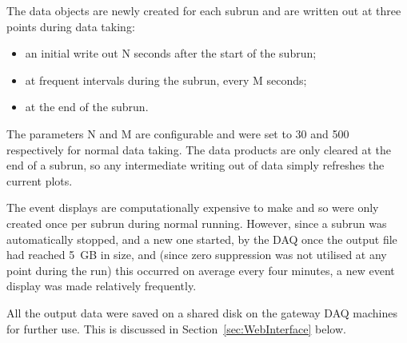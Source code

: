 The data objects are newly created for each subrun and are written out at three points during data taking:
\begin{itemize}
\item an initial write out N seconds after the start of the subrun;
\item at frequent intervals during the subrun, every M seconds;
\item at the end of the subrun.
\end{itemize}
The parameters N and M are configurable and were set to 30 and 500 respectively for normal data taking.  The data products are only cleared at the end of a subrun, so any intermediate writing out of data simply refreshes the current plots.

The event displays are computationally expensive to make and so were only created once per subrun during normal running.  However, since a subrun was automatically stopped, and a new one started, by the DAQ once the output file had reached 5~GB in size, and (since zero suppression was not utilised at any point during the run) this occurred on average every four minutes, a new event display was made relatively frequently.

All the output data were saved on a shared disk on the gateway DAQ machines for further use.  This is discussed in Section~\ref{sec:WebInterface} below.



